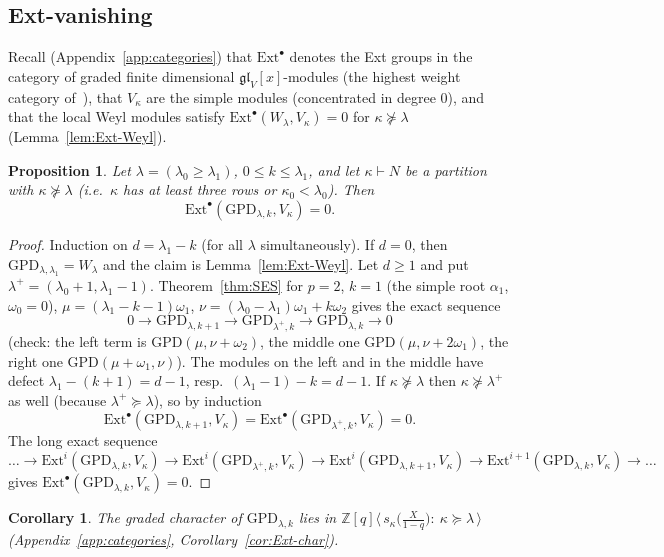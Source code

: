 \documentclass[11pt]{amsart}
\numberwithin{equation}{section}
\newtheorem{proposition}[equation]{Proposition}
\newtheorem{corollary}[equation]{Corollary}
\theoremstyle{definition}
\newcommand{\gl}{\mathfrak{gl}}
\newcommand{\GPD}{\mathrm{GPD}}         %
\newcommand{\Ext}{\mathrm{Ext}}
\begin{document}
	\subsection{Ext-vanishing}\label{ssec:Ext}
	
	Recall (Appendix~\ref{app:categories}) that $\Ext^\bullet$ denotes the Ext groups in the category of graded finite dimensional $\gl_V[x]$-modules (the highest weight category of~\cite{BBCKL}), that $V_\kappa$ are the simple modules (concentrated in degree $0$), and that the local Weyl modules satisfy $\Ext^\bullet(W_\lambda,V_\kappa)=0$ for $\kappa\not\succeq\lambda$ (Lemma~\ref{lem:Ext-Weyl}).
	
	\begin{proposition}\label{prop:Ext}
		Let $\lambda=(\lambda_0\ge\lambda_1)$, $0\le k\le\lambda_1$, and let $\kappa\vdash N$ be a partition with $\kappa\not\succeq\lambda$ (i.e.\ $\kappa$ has at least three rows or $\kappa_0<\lambda_0$). Then
		\[
		\Ext^\bullet(\GPD_{\lambda,k},V_\kappa)=0 .
		\]
	\end{proposition}
	\begin{proof}
		Induction on $d=\lambda_1-k$ (for all $\lambda$ simultaneously). If $d=0$, then $\GPD_{\lambda,\lambda_1}=W_\lambda$ and the claim is Lemma~\ref{lem:Ext-Weyl}. Let $d\ge1$ and put $\lambda^+=(\lambda_0+1,\lambda_1-1)$. Theorem~\ref{thm:SES} for $p=2$, $k=1$ (the simple root $\alpha_1$, $\omega_0=0$), $\mu=(\lambda_1-k-1)\omega_1$, $\nu=(\lambda_0-\lambda_1)\omega_1+k\omega_2$ gives the exact sequence
		\[
		0\to\GPD_{\lambda,k+1}\to\GPD_{\lambda^+,k}\to\GPD_{\lambda,k}\to0
		\]
		(check: the left term is $\GPD(\mu,\nu+\omega_2)$, the middle one $\GPD(\mu,\nu+2\omega_1)$, the right one $\GPD(\mu+\omega_1,\nu)$). The modules on the left and in the middle have defect $\lambda_1-(k+1)=d-1$, resp.\ $(\lambda_1-1)-k=d-1$. If $\kappa\not\succeq\lambda$ then $\kappa\not\succeq\lambda^+$ as well (because $\lambda^+\succeq\lambda$), so by induction $$\Ext^\bullet(\GPD_{\lambda,k+1},V_\kappa)=\Ext^\bullet(\GPD_{\lambda^+,k},V_\kappa)=0.$$ 
		The long exact sequence
		\[
		\dots\to\Ext^i(\GPD_{\lambda,k},V_\kappa)\to\Ext^i(\GPD_{\lambda^+,k},V_\kappa)\to\Ext^i(\GPD_{\lambda,k+1},V_\kappa)\to\Ext^{i+1}(\GPD_{\lambda,k},V_\kappa)\to\dots
		\]
		gives $\Ext^\bullet(\GPD_{\lambda,k},V_\kappa)=0$.
	\end{proof}
	
	\begin{corollary}\label{cor:char-span}
		The graded character of $\GPD_{\lambda,k}$ lies in $\mathbb Z[q]\langle\,s_\kappa\big(\tfrac{X}{1-q}\big):\ \kappa\succeq\lambda\,\rangle$ (Appendix~\ref{app:categories}, Corollary~\ref{cor:Ext-char}).
	\end{corollary}
	
\end{document}
